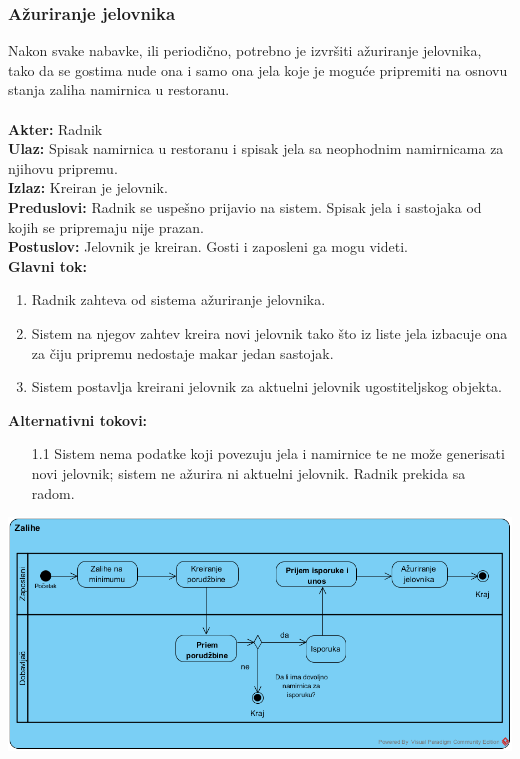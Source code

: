 \documentclass{article}
\begin{document}
\subsubsection{Ažuriranje jelovnika}
Nakon svake nabavke, ili periodično, potrebno je izvršiti ažuriranje jelovnika, tako da se gostima nude ona i samo ona jela koje je moguće pripremiti na osnovu stanja zaliha namirnica u restoranu.\\\\
\textbf{Akter:} Radnik\\
\textbf{Ulaz:} Spisak namirnica u restoranu i spisak jela sa neophodnim namirnicama za njihovu pripremu.\\
\textbf{Izlaz:} Kreiran je jelovnik.\\
\textbf{Preduslovi:} Radnik se uspešno prijavio na sistem. Spisak jela i sastojaka od kojih se pripremaju nije prazan.\\
\textbf{Postuslov:} Jelovnik je kreiran. Gosti i zaposleni ga mogu videti.\\
\textbf{Glavni tok:} 
\begin{enumerate}
	\item Radnik zahteva od sistema ažuriranje jelovnika.
	\item Sistem na njegov zahtev kreira novi jelovnik tako što iz liste jela izbacuje ona za čiju pripremu nedostaje makar jedan sastojak.
	\item Sistem postavlja kreirani jelovnik za aktuelni jelovnik ugostiteljskog objekta.
\end{enumerate}
\textbf{Alternativni tokovi:}
\begin{itemize}
\item [1.1] Sistem nema podatke koji povezuju jela i namirnice te ne može generisati novi jelovnik; sistem ne ažurira ni aktuelni jelovnik. Radnik prekida sa radom.
\end{itemize}

\includegraphics[width=\textwidth]{SU_1_zalihe_activity.png}
\end{document}
